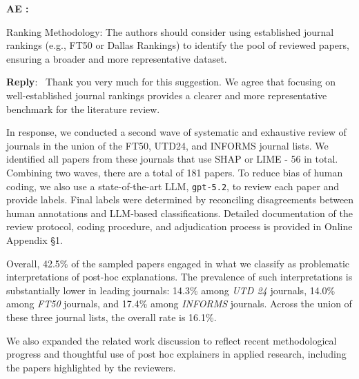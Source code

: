 \documentclass[11pt]{article}
\newcounter{se}[section]
\newcounter{aed}[section]
\newenvironment{aed}[1][]{%
    \refstepcounter{aed}\par\medskip\noindent%
    \textbf{AE \theaed: #1}\rmfamily\itshape%
}{\medskip}
\newcounter{reviewer}
\newenvironment{reply}
 {\par\medskip \noindent \begin{sf}\textbf{Reply}:\ }
 {\medskip \end{sf}}
\begin{document}
\begin{aed}
    Ranking Methodology: The authors should consider using established journal rankings (e.g., FT50 or Dallas Rankings) to identify the pool of reviewed papers, ensuring a broader and more representative dataset.
\end{aed}
\begin{reply}
Thank you very much for this suggestion. We agree that focusing on well-established journal rankings provides a clearer and more representative benchmark for the literature review.

In response, we conducted a second wave of systematic and exhaustive review of journals in the union of the FT50, UTD24, and INFORMS journal lists. We identified all papers from these journals that use SHAP or LIME - 56 in total. Combining two waves, there are a total of 181 papers. To reduce bias of human coding, we also use a state-of-the-art LLM, \texttt{gpt-5.2}, to review each paper and provide labels. Final labels were determined by reconciling disagreements between human annotations and LLM-based classifications. Detailed documentation of the review protocol, coding procedure, and adjudication process is provided in Online Appendix \S 1.

Overall, 42.5\% of the sampled papers engaged in what we classify as problematic interpretations of post-hoc explanations. The prevalence of such interpretations is substantially lower in leading journals: 14.3\% among \textit{UTD 24} journals, 14.0\% among \textit{FT50} journals, and 17.4\% among \textit{INFORMS} journals. Across the union of these three journal lists, the overall rate is 16.1\%.

We also expanded the related work discussion to reflect recent methodological progress and thoughtful use of post hoc explainers in applied research, including the papers highlighted by the reviewers.

\end{reply}
\end{document}
